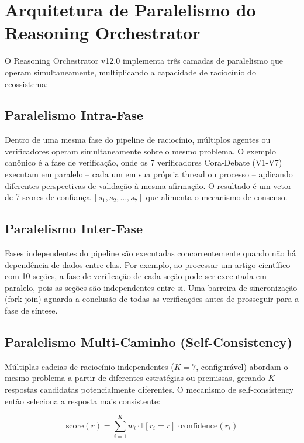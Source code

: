 \documentclass[12pt,a4paper,sumario=tradicional,openany]{abntex2}
\begin{document}
\section{Arquitetura de Paralelismo do Reasoning Orchestrator}

O Reasoning Orchestrator v12.0 implementa três camadas de paralelismo que operam simultaneamente, multiplicando a capacidade de raciocínio do ecossistema:

\subsection{Paralelismo Intra-Fase}

Dentro de uma mesma fase do pipeline de raciocínio, múltiplos agentes ou verificadores operam simultaneamente sobre o mesmo problema. O exemplo canônico é a fase de verificação, onde os 7 verificadores Cora-Debate (V1-V7) executam em paralelo -- cada um em sua própria thread ou processo -- aplicando diferentes perspectivas de validação à mesma afirmação. O resultado é um vetor de 7 scores de confiança $[s_1, s_2, \ldots, s_7]$ que alimenta o mecanismo de consenso.

\subsection{Paralelismo Inter-Fase}

Fases independentes do pipeline são executadas concorrentemente quando não há dependência de dados entre elas. Por exemplo, ao processar um artigo científico com 10 seções, a fase de verificação de cada seção pode ser executada em paralelo, pois as seções são independentes entre si. Uma barreira de sincronização (fork-join) aguarda a conclusão de todas as verificações antes de prosseguir para a fase de síntese.

\subsection{Paralelismo Multi-Caminho (Self-Consistency)}

Múltiplas cadeias de raciocínio independentes ($K=7$, configurável) abordam o mesmo problema a partir de diferentes estratégias ou premissas, gerando $K$ respostas candidatas potencialmente diferentes. O mecanismo de self-consistency então seleciona a resposta mais consistente:

\begin{equation}
\text{score}(r) = \sum_{i=1}^{K} w_i \cdot \mathbb{I}[r_i = r] \cdot \text{confidence}(r_i)
\end{equation}
\end{document}
